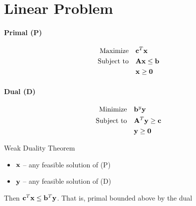 \section{Linear Problem}
\begin{multicols}{2}
\paragraph{Primal (P)}
\begin{align*}
    \text{Maximize} \quad & \mathbf{c}^T \mathbf{x} \\
    \text{Subject to} \quad & \mathbf{A}\mathbf{x} \leq \mathbf{b} \\
                        & \mathbf{x} \geq \mathbf{0}
\end{align*}
\paragraph{Dual (D)}
\begin{align*}
\text{Minimize} \quad &\mathbf{b}^y \mathbf{y} \\
\text{Subject to} \quad & \mathbf{A}^T \mathbf{y} \geq \mathbf{c}\\
& \mathbf{y} \geq \mathbf{0}
\end{align*}
\end{multicols}


\begin{thm}{Weak Duality Theorem}
    \begin{itemize}
        \item $\mathbf{x}$ -- any feasible solution of (P)
        \item $\mathbf{y}$ -- any feasible solution of (D)
    \end{itemize}
    Then $\mathbf{c}^T \mathbf{x} \leq \mathbf{b}^T\mathbf{y}$. That is, primal bounded above by the
    dual
\end{thm}

